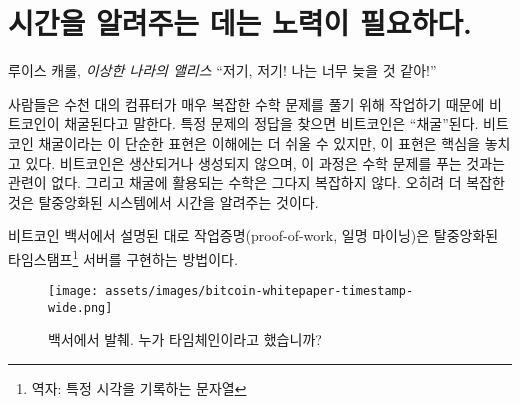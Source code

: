 \chapter{시간을 알려주는 데는 노력이 필요하다.}
\label{les:17}

\begin{chapquote}{루이스 캐롤, \textit{이상한 나라의 앨리스}}
\enquote{저기, 저기! 나는 너무 늦을 것 같아!}
\end{chapquote}

\begin{comment}
It is often said that bitcoins are mined because thousands of computers
work on solving \textit{very complex} mathematical problems. Certain problems
are to be solved, and if you compute the right answer, you \enquote{produce} a
bitcoin. While this simplified view of bitcoin mining might be easier to
convey, it does miss the point somewhat. Bitcoins aren't produced or
created, and the whole ordeal is not really about solving particular
math problems. Also, the math isn't particularly complex. What is
complex is \textit{telling the time} in a decentralized system.
\end{comment}
사람들은 수천 대의 컴퓨터가 매우 복잡한 수학 문제를 풀기 위해 작업하기 때문에 비트코인이 채굴된다고 말한다.
특정 문제의 정답을 찾으면 비트코인은 \enquote{채굴}된다.
비트코인 채굴이라는 이 단순한 표현은 이해에는 더 쉬울 수 있지만, 이 표현은 핵심을 놓치고 있다.
비트코인은 생산되거나 생성되지 않으며, 이 과정은 수학 문제를 푸는 것과는 관련이 없다.
그리고 채굴에 활용되는 수학은 그다지 복잡하지 않다. 
오히려 더 복잡한 것은 탈중앙화된 시스템에서 시간을 알려주는 것이다.

\begin{comment}
As outlined in the whitepaper, the proof-of-work system (aka mining) is
a way to implement a distributed timestamp server.
\end{comment}
비트코인 백서에서 설명된 대로 작업증명(proof-of-work, 일명 마이닝)은 탈중앙화된 타임스탬프\footnote{역자: 특정 시각을 기록하는 문자열} 서버를 구현하는 방법이다.

\begin{figure}
  \texttt{[image: assets/images/bitcoin-whitepaper-timestamp-wide.png]}
  \caption{백서에서 발췌. 누가 타임체인이라고 했습니까?}
  \label{fig:bitcoin-whitepaper-timestamp-wide}
\end{figure}

